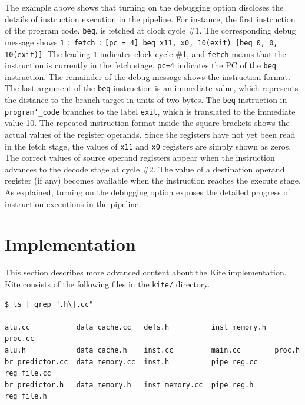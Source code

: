 \documentclass[10pt]{article}
\begin{document}
The example above shows that turning on the debugging option discloses the details of instruction execution in the pipeline.
For instance, the first instruction of the program code, {\tt\small beq}, is fetched at clock cycle \#1.
The corresponding debug message shows {\tt\small 1} {\tt\small :} {\tt\small fetch} {\tt\small :} {\tt\small[pc = 4] beq x11, x0, 10(exit) [beq 0, 0, 10(exit)]}.
The leading {\tt\small 1} indicates clock cycle \#1, and {\tt\small fetch} means that the instruction is currently in the fetch stage.
{\tt\small pc=4} indicates the PC of the {\tt\small beq} instruction.
The remainder of the debug message shows the instruction format.
The last argument of the {\tt\small beq} instruction is an immediate value, which represents the distance to the branch target in units of two bytes.
The {\tt\small beq} instruction in {\tt\small program\char`_code} branches to the label {\tt\small exit}, which is translated to the immediate value 10.
The repeated instruction format inside the square brackets shows the actual values of the register operands.
Since the registers have not yet been read in the fetch stage, the values of {\tt\small x11} and {\tt\small x0} registers are simply shown as zeros.
The correct values of source operand registers appear when the instruction advances to the decode stage at cycle \#2.
The value of a destination operand register (if any) becomes available when the instruction reaches the execute stage.
As explained, turning on the debugging option exposes the detailed progress of instruction executions in the pipeline.


\section{Implementation} \label{sec:implementation}
This section describes more advanced content about the Kite implementation.
Kite consists of the following files in the {\tt\small kite/} directory.

\begin{Verbatim}[frame=single,fontsize=\small]
$ ls | grep ".h\|.cc"

alu.cc           data_cache.cc   defs.h          inst_memory.h  proc.cc
alu.h            data_cache.h    inst.cc         main.cc        proc.h
br_predictor.cc  data_memory.cc  inst.h          pipe_reg.cc    reg_file.cc
br_predictor.h   data_memory.h   inst_memory.cc  pipe_reg.h     reg_file.h
\end{Verbatim}
\end{document}
